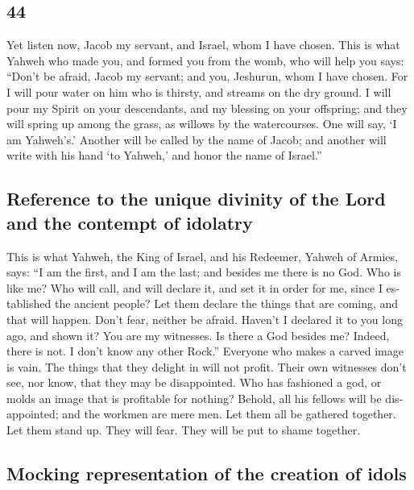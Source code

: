 \begin{paracol}{2}
\begin{otherlanguage}{english}
\hypertarget{section-87}{%
\section{44}\label{section-87}}

 Yet listen now, Jacob my servant, and Israel, whom I have
chosen.  This is what Yahweh who made you, and formed you
from the womb, who will help you says: ``Don't be afraid, Jacob my
servant; and you, Jeshurun, whom I have chosen.  For I
will pour water on him who is thirsty, and streams on the dry ground. I
will pour my Spirit on your descendants, and my blessing on your
offspring;  and they will spring up among the grass, as
willows by the watercourses.  One will say, `I am
Yahweh's.' Another will be called by the name of Jacob; and another will
write with his hand `to Yahweh,' and honor the name of Israel.''

\hypertarget{reference-to-the-unique-divinity-of-the-lord-and-the-contempt-of-idolatry}{%
\subsection{Reference to the unique divinity of the Lord and the
contempt of
idolatry}\label{reference-to-the-unique-divinity-of-the-lord-and-the-contempt-of-idolatry}}

 This is what Yahweh, the King of Israel, and his
Redeemer, Yahweh of Armies, says: ``I am the first, and I am the last;
and besides me there is no God.  Who is like me? Who will
call, and will declare it, and set it in order for me, since I
established the ancient people? Let them declare the things that are
coming, and that will happen.  Don't fear, neither be
afraid. Haven't I declared it to you long ago, and shown it? You are my
witnesses. Is there a God besides me? Indeed, there is not. I don't know
any other Rock.''  Everyone who makes a carved image is
vain. The things that they delight in will not profit. Their own
witnesses don't see, nor know, that they may be disappointed.
 Who has fashioned a god, or molds an image that is
profitable for nothing?  Behold, all his fellows will be
disappointed; and the workmen are mere men. Let them all be gathered
together. Let them stand up. They will fear. They will be put to shame
together.

\hypertarget{mocking-representation-of-the-creation-of-idols}{%
\subsection{Mocking representation of the creation of
idols}\label{mocking-representation-of-the-creation-of-idols}}


\end{otherlanguage}
\end{paracol}
